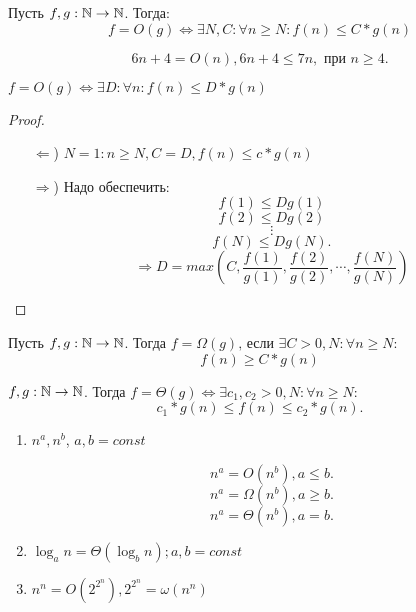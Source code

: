 \begin{definition}
Пусть $f, g: \mathbb{N} \rightarrow \mathbb{N}$. Тогда:
\[
    f = O(g) \iff \exists N, C \colon \forall n \geq N \colon f(n) \leq C * g(n)
\]
\begin{example}
\[
6n + 4 = O(n), 6n + 4 \leq 7n, \text{ при } n \geq 4
.\] 
\end{example}

\end{definition}

\begin{statement}
$f = O(g) \iff \exists D \colon \forall n \colon f(n) \leq D * g(n)$
\end{statement}
\begin{proof}
    ~\newline
\begin{itemize}
    \item [$\Leftarrow$)] $N = 1 \colon n \geq N, C = D, f(n) \leq c * g(n)$
    \item [$\Rightarrow$)] Надо обеспечить:
        \[
        f(1) \leq D g(1)
        \] 
        \[
        f(2) \leq D g(2)
        \] 
        \[
            \vdots
        \]
         \[
        f(N) \leq D g(N)
        .\] 
        \[
            \Rightarrow D = max(C, \frac{f(1)}{g(1)}, \frac{f(2)}{g(2)}, \cdots, \frac{f(N)}{g(N)})
        \]
\end{itemize}
\end{proof}

\begin{definition}
Пусть $f, g: \mathbb{N} \rightarrow \mathbb{N}$. Тогда $f = \Omega(g) \text{, если } \exists C > 0, N \colon \forall n \geq N$: 
\[
f(n) \geq C * g(n)
\] 
\end{definition}
\begin{definition}
$f, g: \mathbb{N} \rightarrow \mathbb{N}$. Тогда $f = \Theta(g) \iff \exists c_1, c_2 > 0, N \colon \forall n \geq N$:
\[
c_1 * g(n) \leq f(n) \leq c_2 * g(n)
.\] 
\end{definition}
\begin{example}
\begin{enumerate}
    \item $n^{a}, n^{b}$, $a, b = const$ 

        \[
        n^{a} = O(n^{b}), a \leq b
        .\] 
        \[
        n^{a} = \Omega(n^{b}), a \geq b
        .\] 
        \[
        n^{a} = \Theta(n^{b}), a = b
        .\] 
    \item $\log_{a}{n} = \Theta(\log_{b}{n}); a, b = const$ 
    \item $n^{n} = O(2^{2^{n}}), 2^{2^{n}} = \omega(n^{n})$
\end{enumerate}
\end{example}

